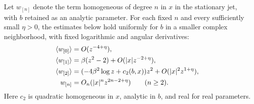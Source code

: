 \begin{lemma}\label{phase:jets}
Let $w_{[n]}$ denote the term homogeneous of degree $n$ in $x$ in the
stationary jet, with $b$ retained as an analytic parameter.  For each
fixed $n$ and every sufficiently small $\eta>0$, the estimates below
hold uniformly for $b$ in a smaller complex neighborhood, with fixed
logarithmic and angular derivatives:
\begin{align}
 \langle w_{[0]}\rangle&=O(z^{-4+\eta}),\notag\\
 \langle w_{[1]}\rangle
       &=\beta(z^2-2)+O(|x|z^{-2+\eta}),\notag\\
 \langle w_{[2]}\rangle
       &=(-4\beta^2\log z+c_2(b,x))z^2
                                  +O(|x|^2z^{1+\eta}),
 \label{phase:mean-jets}\\
 w_{[n]}&=O_n(|x|^n z^{2n-2+\eta})\qquad(n\ge2).
 \label{phase:all-jets}
\end{align}
Here $c_2$ is quadratic homogeneous in $x$, analytic in $b$, and real
for real parameters.
\end{lemma}
